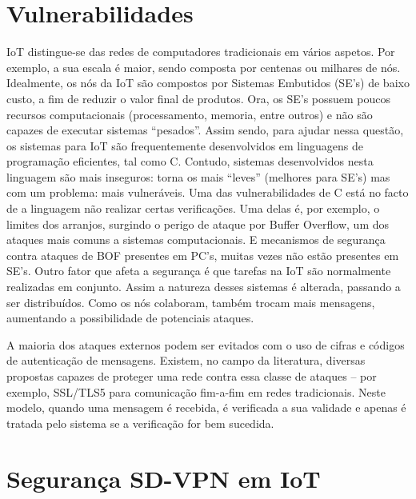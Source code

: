 \documentclass{llncs}
\begin{document}
\section{Vulnerabilidades}
IoT distingue-se das redes de computadores tradicionais em vários aspetos. Por exemplo, a sua escala é maior, sendo composta por centenas ou milhares de nós.
Idealmente, os nós da IoT são compostos por Sistemas Embutidos (SE's) de baixo custo, a fim de reduzir o valor final de produtos. Ora, os SE's possuem poucos recursos computacionais (processamento,
memoria, entre outros) e não são capazes de executar sistemas “pesados”. Assim sendo, para 
ajudar nessa questão, os sistemas para IoT são frequentemente desenvolvidos em linguagens de programação eficientes, tal como C.
Contudo, sistemas desenvolvidos nesta linguagem são mais inseguros: torna os mais “leves” (melhores para SE's) mas com um problema: mais vulneráveis. Uma das vulnerabilidades de C está no facto de a linguagem não realizar certas verificações. Uma delas é, por exemplo, o limites dos arranjos, surgindo o perigo de ataque por
Buffer Overflow, um dos ataques mais comuns a sistemas
computacionais. E mecanismos de segurança contra ataques de BOF presentes em PC's, muitas vezes não estão presentes em SE's. Outro fator que afeta a segurança é que tarefas na IoT são normalmente realizadas em conjunto. Assim a natureza desses sistemas é alterada, passando a ser distribuídos. Como os nós colaboram, também trocam mais mensagens, aumentando a possibilidade de potenciais ataques.

A maioria dos ataques externos podem ser evitados com o uso de cifras e
códigos de autenticação de mensagens. Existem, no campo da literatura, diversas propostas capazes de proteger uma rede contra essa classe de ataques – por exemplo, SSL/TLS5 para comunicação fim-a-fim em redes tradicionais. Neste modelo, quando uma mensagem é
recebida, é verificada a sua validade e apenas é tratada pelo sistema se a verificação for bem sucedida.\cite{Fernando} \cite{Jorge}

\section{Segurança SD-VPN em IoT}

\end{document}

